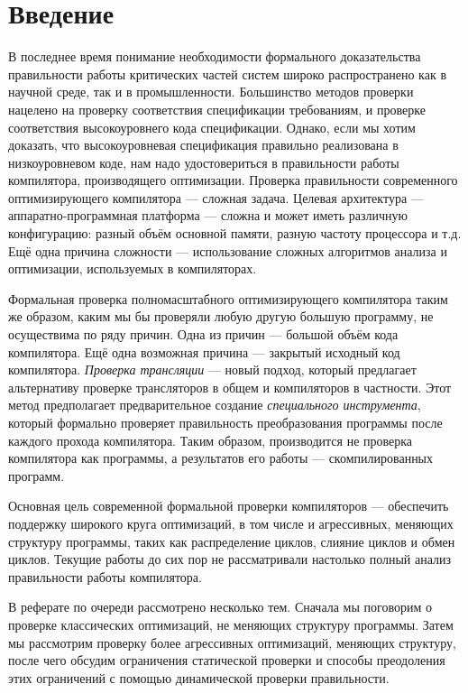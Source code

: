 \section*{Введение}
%

В последнее время понимание необходимости формального доказательства правильности работы критических частей систем широко распространено как в научной среде, так и в промышленности. Большинство методов проверки нацелено на проверку соответствия спецификации требованиям, и проверке соответствия высокоуровнего кода спецификации. Однако, если мы хотим доказать, что высокоуровневая спецификация правильно реализована в низкоуровневом коде, нам надо удостовериться в правильности работы компилятора, производящего оптимизации. Проверка правильности современного оптимизирующего компилятора --- сложная задача. Целевая архитектура --- аппаратно-программная платформа --- сложна и может иметь различную конфигурацию: разный объём основной памяти, разную частоту процессора и т.д. Ещё одна причина сложности --- использование сложных алгоритмов анализа и оптимизации, используемых в компиляторах.

Формальная проверка полномасштабного оптимизирующего компилятора таким же образом, каким мы бы проверяли любую другую большую программу, не осуществима по ряду причин. Одна из причин --- большой объём кода компилятора. Ещё одна возможная причина --- закрытый исходный код компилятора. \emph{Проверка трансляции} --- новый подход, который предлагает альтернативу проверке трансляторов в общем и компиляторов в частности. Этот метод предполагает предварительное создание \emph{специального инструмента}, который формально проверяет правильность преобразования программы после каждого прохода компилятора. Таким образом, производится не проверка компилятора как программы, а результатов его работы --- скомпилированных программ.

Основная цель современной формальной проверки компиляторов --- обеспечить поддержку широкого круга оптимизаций, в том числе и агрессивных, меняющих структуру программы, таких как распределение циклов, слияние циклов и обмен циклов. Текущие работы \cite{PSS98a,Nec00,RM00,ZPFG02} до сих пор не рассматривали настолько полный анализ правильности работы компилятора.

В реферате по очереди рассмотрено несколько тем. Сначала мы поговорим о проверке классических оптимизаций, не меняющих структуру программы. Затем мы рассмотрим проверку более агрессивных оптимизаций, меняющих структуру, после чего обсудим ограничения статической проверки и способы преодоления этих ограничений с помощью динамической проверки правильности.

